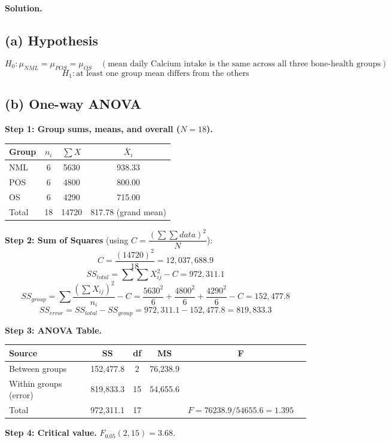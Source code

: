 \documentclass[11pt]{article}
\newcommand{\soln}{\par\noindent\textcolor{acolor}{\textbf{Solution.}}\quad}
\begin{document}
\soln

\subsection*{(a) Hypothesis}
\[
H_0: \mu_{NML} = \mu_{POS} = \mu_{OS} \quad (\text{mean daily Calcium intake is the same across all three bone-health groups})
\]
\[
H_1: \text{at least one group mean differs from the others}
\]

\subsection*{(b) One-way ANOVA}

\textbf{Step 1: Group sums, means, and overall ($N=18$).}
\begin{center}
\begin{tabular}{lccc}
\toprule
Group & $n_i$ & $\sum X$ & $\bar{X}_i$ \\
\midrule
NML & 6 & 5630 & 938.33 \\
POS & 6 & 4800 & 800.00 \\
OS  & 6 & 4290 & 715.00 \\
\midrule
Total & 18 & 14720 & 817.78 (grand mean) \\
\bottomrule
\end{tabular}
\end{center}

\textbf{Step 2: Sum of Squares} (using $C = \dfrac{(\sum\sum data)^2}{N}$):
\[
C = \frac{(14720)^2}{18} = 12{,}037{,}688.9
\]
\[
SS_{total} = \sum\sum X_{ij}^2 - C = 972{,}311.1
\]
\[
SS_{group} = \sum \frac{(\sum X_{ij})^2}{n_i} - C = \frac{5630^2}{6}+\frac{4800^2}{6}+\frac{4290^2}{6} - C = 152{,}477.8
\]
\[
SS_{error} = SS_{total} - SS_{group} = 972{,}311.1 - 152{,}477.8 = 819{,}833.3
\]

\textbf{Step 3: ANOVA Table.}
\begin{center}
\begin{tabular}{lccccc}
\toprule
Source & SS & df & MS & F \\
\midrule
Between groups & 152{,}477.8 & 2  & 76{,}238.9 & \\
Within groups (error) & 819{,}833.3 & 15 & 54{,}655.6 & \\
\midrule
Total & 972{,}311.1 & 17 & & $F = 76238.9/54655.6 = 1.395$ \\
\bottomrule
\end{tabular}
\end{center}

\textbf{Step 4: Critical value.} $F_{0.05}(2,15) = 3.68$.
\end{document}
